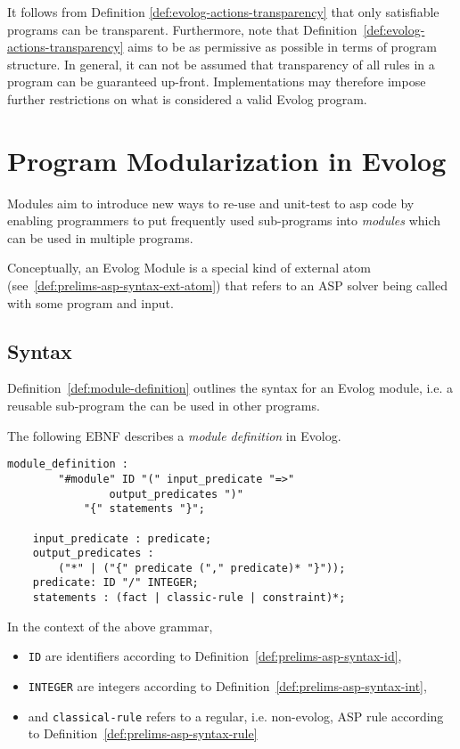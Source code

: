 It follows from Definition \ref{def:evolog-actions-transparency} that only satisfiable programs can be transparent. Furthermore, note that Definition~\ref{def:evolog-actions-transparency} aims to be as permissive as possible in terms of program structure. In general, it can not be assumed that transparency of all rules in a program can be guaranteed up-front. Implementations may therefore impose further restrictions on what is considered a valid Evolog program.

\section{Program Modularization in Evolog}
\label{sec:evolog-modules}

Modules aim to introduce new ways to re-use and unit-test to \gls{asp} code by enabling programmers to put frequently used sub-programs into \emph{modules} which can be used in multiple programs.

Conceptually, an Evolog Module is a special kind of external atom (see~\ref{def:prelims-asp-syntax-ext-atom}) that refers to an ASP solver being called with some program and input.

\subsection{Syntax}
\label{subsec:evolog-modules-syntax}

Definition~\ref{def:module-definition} outlines the syntax for an Evolog module, i.e. a reusable sub-program the can be used in other programs.

\begin{definition}
\label{def:module-definition}
The following EBNF describes a \emph{module definition} in Evolog.
\begin{lstlisting}[style=code, label={lst:module-def-grammar}]
	module_definition : 
		"#module" ID "(" input_predicate "=>" 
				output_predicates ")" 
			"{" statements "}";
		
	input_predicate : predicate;
	output_predicates : 
		("*" | ("{" predicate ("," predicate)* "}"));
	predicate: ID "/" INTEGER;
	statements : (fact | classic-rule | constraint)*;
\end{lstlisting} 
In the context of the above grammar,
\begin{itemize}
	\item \texttt{ID} are identifiers according to Definition~\ref{def:prelims-asp-syntax-id},
	\item \texttt{INTEGER} are integers according to Definition~\ref{def:prelims-asp-syntax-int},
	\item and \texttt{classical-rule} refers to a regular, i.e. non-evolog, ASP rule according to Definition~\ref{def:prelims-asp-syntax-rule}
\end{itemize}
\end{definition}

